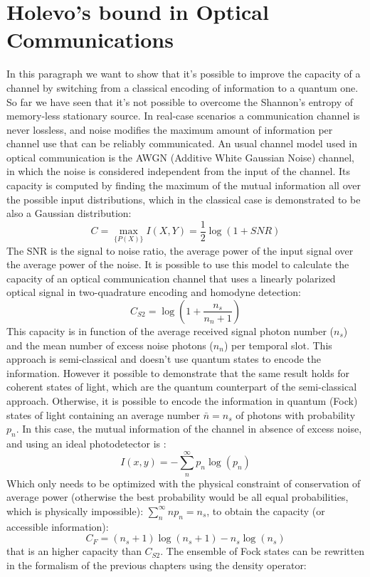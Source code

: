 \documentclass[journal, letterpaper]{IEEEtran}
\begin{document}
\section{Holevo's bound in Optical Communications}
In this paragraph we want to show that it's possible to improve the capacity of a channel by switching from a classical encoding of information to a quantum one. So far we have seen that it's not possible to overcome the Shannon's entropy of memory-less stationary source. In real-case scenarios a communication channel is never lossless, and noise modifies the maximum amount of information per channel use that can be reliably communicated. An usual channel model used in optical communication is the AWGN (Additive White Gaussian Noise) channel, in which the noise is considered independent from the input of the channel. Its capacity is computed by finding the maximum of the mutual information all over the possible input distributions, which in the classical case is demonstrated to be also a Gaussian distribution: 
\[C = \max_{\{P(X)\}}{I(X,Y)} = \frac{1}{2}\log(1+SNR) \]
The SNR is the signal to noise ratio, the average power of the input signal over the average power of the noise. It is possible to use this model to calculate the capacity of an optical communication channel that uses a linearly polarized optical signal in two-quadrature encoding\cite{banaszek,gordon} and homodyne detection:
\[C_{S2} =\log(1+ \frac{n_s}{n_n+1})\]
This capacity is in function of the average received signal photon number ($n_s$) and the mean number of excess noise photons ($n_n$) per temporal slot. This approach is semi-classical and doesn't use quantum states to encode the information. However it possible to demonstrate that the same result holds for coherent states of light, which are the quantum counterpart of the semi-classical approach\cite{semic}. Otherwise, it is possible to encode the information in quantum (Fock) states of light containing an average number $\bar{n} = n_s$ of photons with probability $p_n$. In this case, the mutual information of the channel in absence of excess noise, and using an ideal photodetector is \cite{gordon}: 
\[I(x,y) = -\sum_n^{\infty} p_n\log(p_n) \]
Which only needs to be optimized with the physical constraint of conservation of average power (otherwise the best probability would be all equal probabilities, which is physically impossible): $\sum_n^{\infty} np_n = n_s$, to obtain the capacity (or accessible information): 
\[C_{F} = (n_s+1)\log(n_s+1)-n_s\log(n_s)\] that is an higher capacity than $C_{S2}$. 
The ensemble of Fock states can be rewritten in the formalism of the previous chapters using the density operator: 
\end{document}
